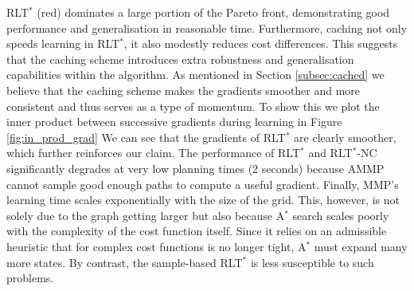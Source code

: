 \documentclass[letterpaper, 10 pt, conference]{ieeeconf}
\begin{document}
	 RLT$^*$ (red) dominates a large portion of the Pareto front, demonstrating good performance and generalisation in reasonable time. Furthermore, caching not only speeds learning in RLT$^*$, it also modestly reduces cost differences. This suggests that the caching scheme introduces extra robustness and generalisation capabilities within the algorithm. As mentioned in Section \ref{subsec:cached} we believe that the caching scheme makes the gradients smoother and more consistent and thus serves as a type of momentum. To show this we plot the inner product between successive gradients during learning in Figure \ref{fig:in_prod_grad} We can see that the gradients of RLT$^*$ are clearly smoother, which further reinforces our claim. The performance of RLT$^*$ and RLT$^*$-NC significantly degrades at very low planning times (2 seconds) because AMMP cannot sample good enough paths to compute a useful gradient. Finally, MMP's learning time scales exponentially with the size of the grid. This, however, is not solely due to the graph getting larger but also because A$^*$ search scales poorly with the complexity of the cost function itself. Since it relies on an admissible heuristic that for complex cost functions is no longer tight, A$^*$ must expand many more states. By contrast, the sample-based RLT$^*$ is less susceptible to such problems.
\end{document}
